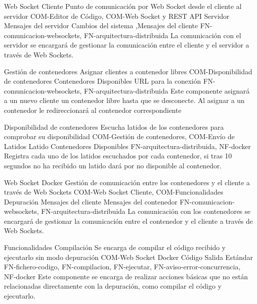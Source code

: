 \begin{component}{Web Socket Cliente}
{Punto de comunicación por Web Socket desde el cliente al servidor}
{COM-Editor de Código, COM-Web Socket y REST API Servidor} %
{Mensajes del servidor} %
{Cambios del sistema ,Mensajes del cliente} %
{FN-comunicacion-websockets, FN-arquitectura-distribuida} %
La comunicación con el servidor se encargará de gestionar la comunicación entre el cliente y el servidor a través de Web Sockets. %
\end{component}


\begin{component}{Gestión de contenedores}
{Asignar clientes a contenedor libres}
{COM-Disponibilidad de contenedores} %
{Contenedores Disponibles} %
{URL para la conexión} %
{FN-comunicacion-websockets, FN-arquitectura-distribuida} %
Este componente asignará a un nuevo cliente un contenedor libre hasta que se desconecte. Al asignar a un contenedor le redireccionará al contenedor correspondiente %
\end{component}

\begin{component}{Disponibilidad de contenedores}
{Escucha latidos de los contenedores para comprobar su disponibilidad }
{COM-Gestión de contenedores, COM-Envío de Latidos} %
{Latido} %
{Contenedores Disponibles} %
{FN-arquitectura-distribuida, NF-docker} %
Registra cada uno de los latidos escuchados por cada contenedor, si tras 10 segundos no ha recibido un latido dará por no disponible al contenedor. %
\end{component}


\begin{component}{Web Socket Docker}
{Gestión de comunicación entre los contenedores y el cliente a través de Web Sockets}
{COM-Web Socket Cliente, COM-Funcionalidades Depuración} %
{Mensajes del cliente} %
{Mensajes del contenedor} %
{FN-comunicacion-websockets, FN-arquitectura-distribuida} %
La comunicación con los contenedores se encargará de gestionar la comunicación entre el contenedor y el cliente a través de Web Sockets. %
\end{component}

\begin{component}{Funcionalidades Compilación}
{Se encarga de compilar el código recibido y ejecutarlo sin modo depuración}
{COM-Web Socket Docker}
{Código}
{Salida Estándar}
{FN-fichero-codigo, FN-compilacion, FN-ejecutar, FN-aviso-error-concurrencia, NF-docker}
Este componente se encarga de realizar acciones básicas que no están relacionadas directamente con la depuración, como compilar el código y ejecutarlo.
\end{component}

